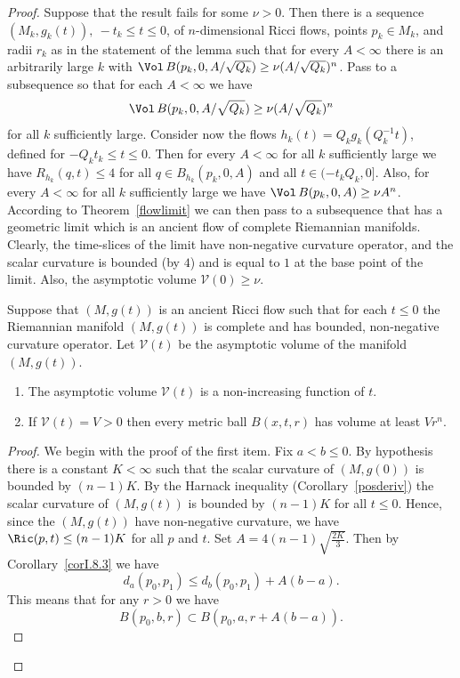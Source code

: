 \begin{proof}
Suppose that the result fails for some $\nu>0$. Then there is a
sequence $(M_k,g_k(t)),\ -t_k\le t\le 0$, of $n$-dimensional Ricci
flows, points $p_k\in M_k$, and radii $r_k$ as in the statement of
the lemma such that for every $A<\infty$ there is an arbitrarily
large $k$ with $\Vol\,B(p_k,0,A/\sqrt{Q_k})\ge
\nu(A/\sqrt{Q_k})^n$. Pass to a subsequence so that for each
$A<\infty$ we have
$$\Vol\,B(p_k,0,A/\sqrt{Q_k})\ge\nu(A/\sqrt{Q_k})^n$$ for all $k$
sufficiently large. Consider now the flows
$h_k(t)=Q_kg_k(Q_k^{-1}t)$, defined for $-Q_kt_k\le t\le 0$. Then
for every $A<\infty$ for all $k$ sufficiently large we have
$R_{h_k}(q,t)\le 4$ for all $q\in B_{h_k}(p_k,0,A)$ and all $t\in
(-t_kQ_k,0]$. Also, for every $A<\infty$ for all $k$ sufficiently
large we have $\Vol\,B(p_k,0,A)\ge\nu A^n$. According to
Theorem~\ref{flowlimit} we can then pass to a subsequence that has a
geometric limit which is an ancient flow of complete Riemannian
manifolds. Clearly, the time-slices of the limit have non-negative
curvature operator, and the scalar curvature is bounded (by $4$) and
is equal to $1$ at the base point of the limit. Also, the asymptotic
volume ${\mathcal V}(0)\ge \nu$.

\begin{claim}\label{claim:asymptotic-volume-monotone}
 Suppose that $(M,g(t))$ is an ancient Ricci flow such that for each
 $t\le 0$ the Riemannian manifold $(M,g(t))$ is complete and has
bounded, non-negative  curvature operator. Let ${\mathcal V}(t)$ be
the asymptotic volume of the manifold $(M,g(t))$.
\begin{enumerate}
\item[(1)] The asymptotic volume ${\mathcal V}(t)$ is a non-increasing function
of $t$. \item[(2)] If ${\mathcal V}(t)=V>0$ then every metric ball
$B(x,t,r)$ has volume at least $Vr^n$.
\end{enumerate}
\end{claim}


\begin{proof}
We begin with the proof of the first item. Fix $a<b\le 0$. By
hypothesis there is a constant $K<\infty$ such that the scalar
curvature of $(M,g(0))$ is bounded by $(n-1)K$. By the Harnack
inequality (Corollary~\ref{posderiv}) the scalar curvature of
$(M,g(t))$ is bounded by $(n-1)K$ for all $t\le 0$. Hence, since the
$(M,g(t))$ have non-negative curvature, we have $\Ric(p,t)\le
(n-1)K$ for all $p$ and $t$. Set $A=4(n-1)\sqrt{\frac{2K}{3}}$. Then
by Corollary~\ref{corI.8.3} we have
$$d_a(p_0,p_1)\le d_b(p_0,p_1)+A(b-a).$$
 This means that for any $r>0$ we have
$$B(p_0,b,r)\subset B(p_0,a,r+A(b-a)).$$


\end{proof}
\end{proof}
